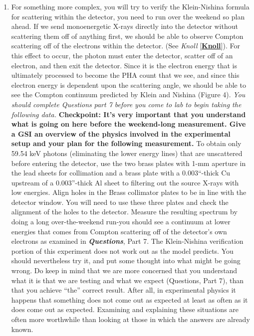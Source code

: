 \documentclass{../lab}
\begin{document}
\begin{enumerate}
    \item For something more complex, you will try to verify the Klein-Nishina formula for scattering within the detector, you need to run over the weekend so plan ahead. If we send monoenergetic X-rays directly into the detector without scattering them off of anything first, we should be able to observe Compton scattering off of the electrons within the detector. (See \emph{Knoll} [\href{http://physics111.lib.berkeley.edu/Physics111/Reprints/COM/COM\_index.html}{\textbf{Knoll}}]). For this effect to occur, the photon must enter the detector, scatter off of an electron, and then exit the detector. Since it is the electron energy that is ultimately processed to become the PHA count that we see, and since this electron energy is dependent upon the scattering angle, we should be able to see the Compton continuum predicted by Klein and Nishina (Figure 4). \emph{You should complete Questions} \emph{part 7 before you come to lab to begin taking the following data.} \textbf{Checkpoint: It's very important that you understand what is going on here before the weekend-long measurement. Give a GSI an overview of the physics involved in the experimental setup and your plan for the following measurement.} To obtain only 59.54 keV photons (eliminating the lower energy lines) that are unscattered before entering the detector, use the two brass plates with 1-mm aperture in the lead sheets for collimation and a brass plate with a 0.003``-thick Cu upstream of a 0.003''-thick Al sheet to filtering out the source X-rays with low energies. Align holes in the Brass collimator plates to be in line with the detector window. You will need to use these three plates and check the alignment of the holes to the detector. Measure the resulting spectrum by doing a long over-the-weekend run-you should see a continuum at lower energies that comes from Compton scattering off of the detector's own electrons as examined in \emph{\textbf{Questions}}, Part 7. The Klein-Nishina verification portion of this experiment does not work out as the model predicts. You should nevertheless try it, and put some thought into what might be going wrong. Do keep in mind that we are more concerned that you understand what it is that we are testing and what we expect (Questions, Part 7), than that you achieve ``the'' correct result. After all, in experimental physics it happens that something does not come out as expected at least as often as it does come out as expected. Examining and explaining these situations are often more worthwhile than looking at those in which the answers are already known.


\end{enumerate}
\end{document}
